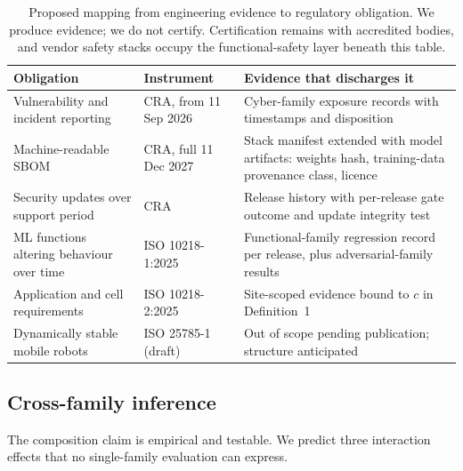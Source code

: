 \documentclass[11pt]{article}
\theoremstyle{definition}
\begin{document}
\begin{table}[t]
\small
\centering
\begin{tabularx}{\textwidth}{@{}X l X@{}}
\toprule
\textbf{Obligation} & \textbf{Instrument} & \textbf{Evidence that discharges it} \\
\midrule
Vulnerability and incident reporting & CRA, from 11 Sep 2026 & Cyber-family exposure records with timestamps and disposition \\
Machine-readable SBOM & CRA, full 11 Dec 2027 & Stack manifest extended with model artifacts: weights hash, training-data provenance class, licence \\
Security updates over support period & CRA & Release history with per-release gate outcome and update integrity test \\
ML functions altering behaviour over time & ISO 10218-1:2025 & Functional-family regression record per release, plus adversarial-family results \\
Application and cell requirements & ISO 10218-2:2025 & Site-scoped evidence bound to $c$ in Definition~1 \\
Dynamically stable mobile robots & ISO 25785-1 (draft) & Out of scope pending publication; structure anticipated \\
\bottomrule
\end{tabularx}
\caption{Proposed mapping from engineering evidence to regulatory obligation. We produce
evidence; we do not certify. Certification remains with accredited bodies, and vendor safety
stacks occupy the functional-safety layer beneath this table.}
\label{tab:compliance}
\end{table}

\subsection{Cross-family inference}
\label{sec:cross}

The composition claim is empirical and testable. We predict three interaction effects that no
single-family evaluation can express.
\end{document}
